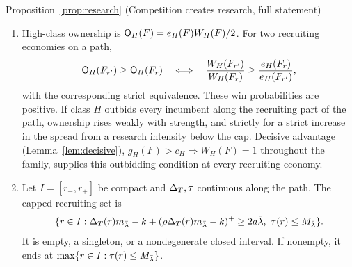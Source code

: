 \begin{named}{Proposition~\ref{prop:research} (Competition creates research, full statement)}
\begin{enumerate}[label=(\alph*),leftmargin=2em]
While the low class abstains or mixes, and after a sure sale becomes strictly profitable, respectively,
\[
 \frac{d\lambda_R}{d\DT}=
 \frac{m_{\lambda_R}}{2a-\DT m'_{\lambda_R}},\qquad
 \frac{d\lambda_R}{d\DT}=
 \frac{(1+\rho)m_{\lambda_R}}{2a-(1+\rho)\DT m'_{\lambda_R}}.
\]
If \((1-\rho)k/(2a\rho)<\lb\), these slopes meet with a strict upward jump at
\(\lambda_R=(1-\rho)k/(2a\rho)\). On an equilibrium path that passes through this intensity, a sure sale's
profit adds a second return to research. Research and entry are continuous through the first sale, the onset of
strictly profitable full selling, and the cap. The cap spread, at which research reaches its cap, is
\[
 \begin{cases}
 (2a\lb+k)/m_{\lb},&\lb\le(1-\rho)k/(2a\rho),\\
 (2a\lb+2k)/[(1+\rho)m_{\lb}],&\lb>(1-\rho)k/(2a\rho).
 \end{cases}
\]

\item High-class ownership is \(\mathsf{O}_H(F)=e_H(F)W_H(F)/2\). For two recruiting economies on a path,
\[
 \mathsf{O}_H(F_{r'})\ge\mathsf{O}_H(F_r)
 \quad\Longleftrightarrow\quad
 \frac{W_H(F_{r'})}{W_H(F_r)}\ge\frac{e_H(F_r)}{e_H(F_{r'})},
\]
with the corresponding strict equivalence. These win probabilities are positive. If class \(H\) outbids every
incumbent along the recruiting part of the path, ownership rises weakly with strength, and strictly for a strict
increase in the spread from a research intensity below the cap. Decisive advantage (Lemma~\ref{lem:decisive}),
\(g_H(F)>c_H\Longrightarrow W_H(F)=1\) throughout the family, supplies this outbidding condition at every
recruiting economy.

\item Let \(I=[r_-,r_+]\) be compact and \(\Delta_T,\tau\) continuous along the path. The capped recruiting set is
\[
 \{r\in I:\Delta_T(r)m_{\bar\lambda}-k+(\rho\Delta_T(r)m_{\bar\lambda}-k)^+\ge2a\bar\lambda,\ \tau(r)\le M_{\bar\lambda}\}.
\]
It is empty, a singleton, or a nondegenerate closed interval. If nonempty, it ends at
\(\max\{r\in I:\tau(r)\le M_{\bar\lambda}\}\).


\end{enumerate}
\end{named}
